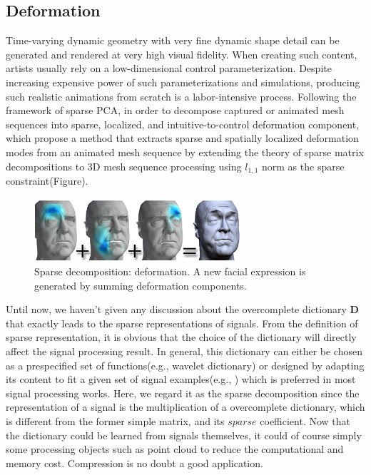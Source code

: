 \subsection{Deformation}

Time-varying dynamic geometry with very fine dynamic shape detail can be generated and rendered at very high visual fidelity. When creating such content, artists usually rely on a low-dimensional control parameterization. Despite increasing expensive power of such parameterizations and simulations, producing such realistic animations from scratch is a labor-intensive process. Following the framework of  sparse PCA\cite{zou2006sparse,jenatton2011structured}, in order to decompose captured or animated mesh sequences into sparse, localized, and intuitive-to-control deformation component, \cite{neumann2013sparse} which propose a method that extracts sparse and spatially localized deformation modes from an animated mesh sequence by extending the theory of sparse matrix decompositions to 3D mesh sequence processing using $l_{1,1}$ norm as the sparse constraint(Figure).

\begin{figure}[ht]
  \centering
  \includegraphics[width=3in]{images/localdefor_learning}
  \caption{Sparse decomposition: deformation\cite{neumann2013sparse}. A new facial expression is generated by summing deformation components.}
\end{figure}


Until now, we haven't given any discussion about the overcomplete dictionary $\mathbf{D}$ that exactly leads to the sparse representations of signals. From the definition of sparse representation, it is obvious that the choice of the dictionary will directly affect the signal processing result. In general, this dictionary can either be chosen as a prespecified set of functions(e.g., wavelet dictionary) or designed by adapting its content to fit a given set of signal examples(e.g., \cite{aharon2006svd}) which is preferred in most signal processing works. Here, we regard it as the sparse decomposition since the representation of a signal is the multiplication of a overcomplete dictionary, which is different from the former simple matrix, and its $sparse$ coefficient. Now that the dictionary could be learned from signals themselves, it could of course simply some processing objects such as point cloud to reduce the computational and memory cost. Compression is no doubt a good application.

